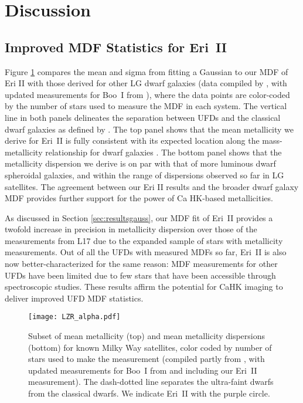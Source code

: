 \documentclass[twocolumn]{aastex63}
\begin{document}
\section{Discussion}
\label{sec:discussion}

\subsection{Improved MDF Statistics for Eri~II}

\par Figure \ref{fig:LZR} compares the mean and sigma from fitting a Gaussian to our MDF of Eri II  with those derived for other LG dwarf galaxies (data compiled by \citealt{simon2019review}, with updated measurements for Boo~I from \citealt{jenkins2021vlt}), where the data points are color-coded by the number of stars used to measure the MDF in each system. The vertical line in both panels delineates the separation between UFDs and the classical dwarf galaxies as defined by \citet{simon2019review}. The top panel shows that the mean metallicity we derive for Eri~II is fully consistent with its expected location along the mass-metallicity relationship for dwarf galaxies \citep{kirby2013LZR}. The bottom panel shows that the metallicity dispersion we derive is on par with that of more luminous dwarf spheroidal galaxies, and within the range of dispersions observed so far in LG satellites. The agreement between our Eri II results and the broader dwarf galaxy MDF provides further support for the power of Ca HK-based metallicities.

\par As discussed in Section \ref{sec:resultsgauss}, our MDF fit of Eri~II provides a twofold increase in precision in metallicity dispersion over those of the measurements from L17 due to the expanded sample of stars with metallicity measurements. Out of all the UFDs with measured MDFs so far, Eri~II is also now better-characterized for the same reason: MDF measurements for other UFDs have been limited due to few stars that have been accessible through spectroscopic studies. These results affirm the potential for CaHK imaging to deliver improved UFD MDF statistics. 

\begin{figure}
    \texttt{[image: LZR\_alpha.pdf]}
    \caption{Subset of mean metallicity (top) and mean metallicity dispersions (bottom) for known Milky Way satellites, color coded by number of stars used to make the measurement (compiled partly from \citet{simon2019review}, with updated measurements for Boo~I from \citet{jenkins2021vlt} and including our Eri~II measurement). The dash-dotted line separates the ultra-faint dwarfs from the classical dwarfs. We indicate Eri~II with the purple circle.}
    \label{fig:LZR}
\end{figure}
\end{document}

